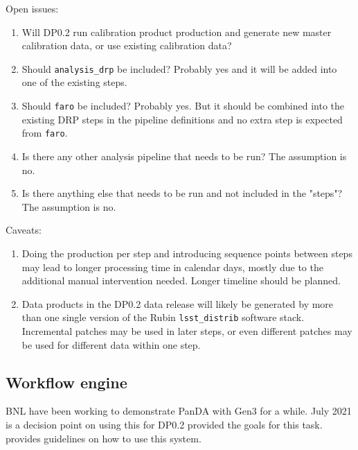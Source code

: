 Open issues:
\begin{enumerate}
  \item Will DP0.2 run calibration product production and generate new master calibration data, or use existing calibration data?
  \item Should \texttt{analysis\_drp} be included? Probably yes and it will be added into one of the existing steps.
  \item Should \texttt{faro} be included? Probably yes. But it should be combined into the existing DRP steps in the pipeline definitions and no extra step is expected from \texttt{faro}.
  \item Is there any other analysis pipeline that needs to be run? The assumption is no.
  \item Is there anything else that needs to be run and not included in the "steps"? The assumption is no.
\end{enumerate}

Caveats:
\begin{enumerate}
  \item Doing the production per step and introducing sequence points between steps may lead to longer processing time in calendar days, mostly due to the additional manual intervention needed. Longer timeline should be planned.
  \item Data products in the DP0.2 data release will likely be generated by more than one single version of the Rubin \texttt{lsst\_distrib} software stack. Incremental patches may be used in later steps, or even different patches may be used for different data within one step.
\end{enumerate}

\subsection {Workflow engine}
BNL have been working to demonstrate PanDA with Gen3 for a while. July 2021 is a decision point on using this for DP0.2
 provided the goals for this task.  provides guidelines on how to use this system.


